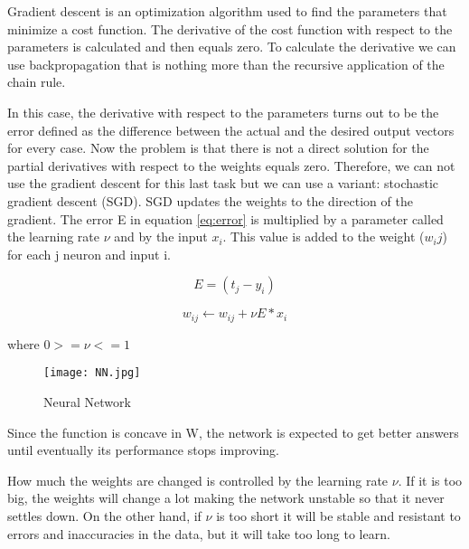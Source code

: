 Gradient descent is an optimization algorithm used to find the parameters  that minimize a cost function. The derivative of the cost function with respect to the parameters is calculated and then equals zero. To calculate the derivative we can use backpropagation that is nothing more than the recursive application of the chain rule.

In this case, the derivative with respect to the parameters turns out to be the error defined as the difference between the actual and the desired output vectors for every case. Now the problem is that there is not a direct solution for the partial derivatives with respect to the weights equals zero. Therefore, we can not use the gradient descent for this last task but we can use a variant: stochastic gradient descent (SGD).
SGD updates the weights to the direction of the gradient. The error E in equation \ref{eq:error} is multiplied by a parameter called the learning rate $\nu$ and by the input $x_i$. This value is added to the weight ($w_ij$) for each j neuron and input i.

\begin{equation}
\label{eq:error}
E=(t_j - y_i)
\end{equation}

\begin{equation}
\label{eq:weight}
w_{ij} \leftarrow w_{ij}+\nu E * x_i
\end{equation} 
\centerline{where $0>=\nu<=1$ \\}

\begin{figure}
\center
\texttt{[image: NN.jpg]}
\caption{Neural Network}
\label{fig:nn}
\end{figure}

Since the function is concave in W, the network is expected to get better answers until eventually its performance stops improving.

How much the weights are changed is controlled by the learning rate $\nu$. If it is too big, the weights will change a lot  making the network unstable so that it never settles down. On the other hand, if $\nu$ is too short it will be stable and resistant to errors and inaccuracies in the data, but it will take too long to learn. 

